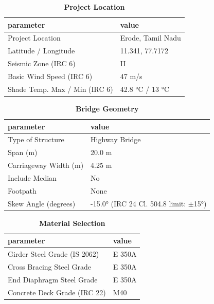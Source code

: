 \documentclass[12pt,a4paper]{report}
\numberwithin{table}{chapter}
\numberwithin{figure}{chapter}
\begin{document}
\begin{table}[H]
\caption{\textbf{Project Location}}
\label{subsec:project-location}
\begin{tabular}{|L{5.5cm}|L{8.5cm}|}
\hline
\textbf{parameter} & \textbf{value} \\
\hline
\textnormal{Project Location} & Erode, Tamil Nadu \\
\hline
\textnormal{Latitude / Longitude} & 11.341, 77.7172 \\
\hline
\textnormal{Seismic Zone (IRC 6)} & II \\
\hline
\textnormal{Basic Wind Speed (IRC 6)} & 47 m/s \\
\hline
\textnormal{Shade Temp. Max / Min (IRC 6)} & 42.8 °C / 13 °C \\
\hline
\end{tabular}
\vspace{0.4cm}
\end{table}

\begin{table}[H]
\caption{\textbf{Bridge Geometry}}
\label{subsec:bridge-geometry}
\begin{tabular}{|L{5.5cm}|L{8.5cm}|}
\hline
\textbf{parameter} & \textbf{value} \\
\hline
\textnormal{Type of Structure} & Highway Bridge \\
\hline
\textnormal{Span (m)} & 20.0 m \\
\hline
\textnormal{Carriageway Width (m)} & 4.25 m \\
\hline
\textnormal{Include Median} & No \\
\hline
\textnormal{Footpath} & None \\
\hline
\textnormal{Skew Angle (degrees)} & -15.0° (IRC 24 Cl. 504.8 limit: $\pm$15°) \\
\hline
\end{tabular}
\end{table}
\vspace{0.4cm}

\begin{table}[H]
\caption{\textbf{Material Selection}}
\label{subsec:material}
\begin{tabular}{|L{5.5cm}|L{8.5cm}|}
\hline
\textbf{parameter} & \textbf{value} \\
\hline
\textnormal{Girder Steel Grade (IS 2062)} & E 350A \\
\hline
\textnormal{Cross Bracing Steel Grade} & E 350A \\
\hline
\textnormal{End Diaphragm Steel Grade} & E 350A \\
\hline
\textnormal{Concrete Deck Grade (IRC 22)} & M40 \\
\hline
\end{tabular}
\end{table}
\vspace{0.4cm}
\end{document}

